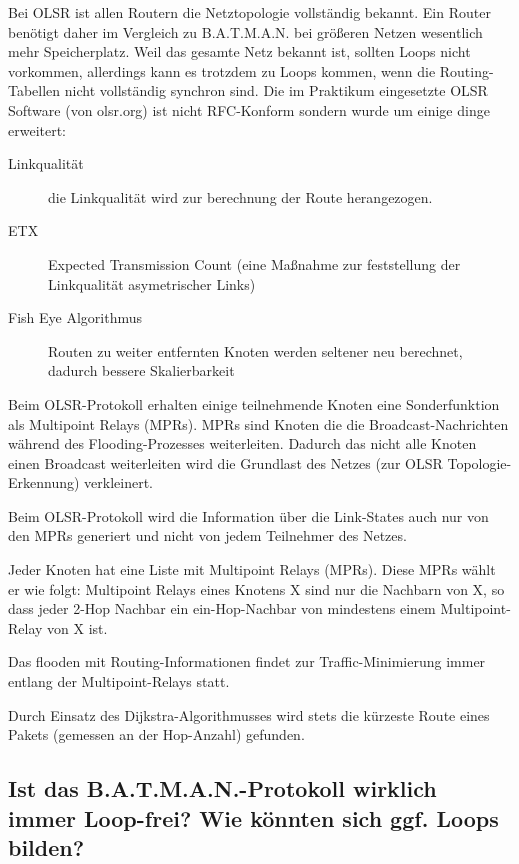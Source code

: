 \documentclass[a4paper,10pt]{article}
\begin{document}
Bei OLSR ist allen Routern die Netztopologie vollständig bekannt. Ein Router benötigt daher im Vergleich zu B.A.T.M.A.N. bei größeren
Netzen wesentlich mehr Speicherplatz.
Weil das gesamte Netz bekannt ist, sollten Loops nicht vorkommen, allerdings kann es trotzdem zu Loops kommen, wenn die Routing-Tabellen nicht 
vollständig synchron sind.
Die im Praktikum eingesetzte OLSR Software (von olsr.org) ist nicht RFC-Konform sondern wurde um einige dinge erweitert:

\begin{description}
\item[Linkqualität] die Linkqualität wird zur berechnung der Route herangezogen.
\item[ETX] Expected Transmission Count (eine Maßnahme zur feststellung der Linkqualität asymetrischer Links)
\item[Fish Eye Algorithmus] Routen zu weiter entfernten Knoten werden seltener neu berechnet, dadurch bessere Skalierbarkeit
\end{description}

Beim OLSR-Protokoll erhalten einige teilnehmende Knoten eine Sonderfunktion als Multipoint Relays (MPRs).
MPRs sind Knoten die die Broadcast-Nachrichten während des Flooding-Prozesses weiterleiten. Dadurch das nicht alle
Knoten einen Broadcast weiterleiten wird die Grundlast des Netzes (zur OLSR Topologie-Erkennung) verkleinert.

Beim OLSR-Protokoll wird die Information über die Link-States auch nur von den MPRs generiert und nicht von jedem
Teilnehmer des Netzes.

Jeder Knoten hat eine Liste mit Multipoint Relays (MPRs). Diese MPRs wählt
er wie folgt: 
Multipoint Relays eines Knotens X sind nur die Nachbarn von X, so dass
jeder 2-Hop Nachbar ein ein-Hop-Nachbar von mindestens einem Multipoint-Relay von X ist.

Das flooden mit Routing-Informationen findet zur Traffic-Minimierung immer entlang der Multipoint-Relays statt.

Durch Einsatz des Dijkstra-Algorithmusses wird stets die kürzeste Route 
eines Pakets (gemessen an der Hop-Anzahl) gefunden.

\subsection{Ist das B.A.T.M.A.N.-Protokoll wirklich immer Loop-frei? Wie könnten sich ggf. Loops bilden?}
\end{document}
